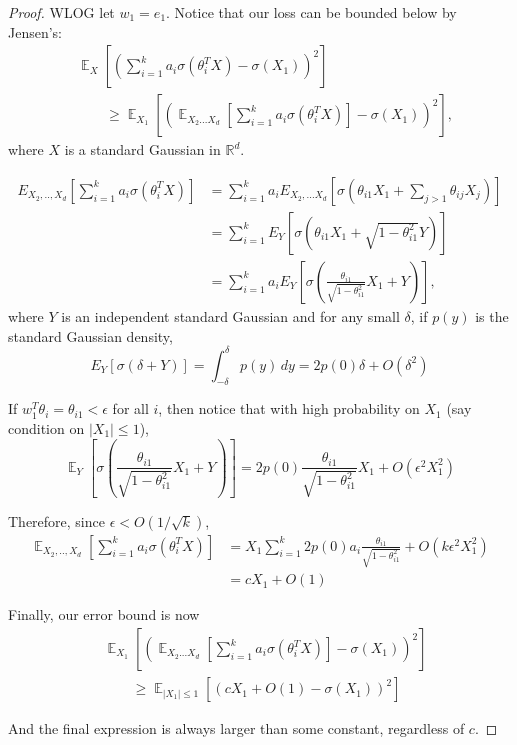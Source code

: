 \documentclass{article}
\newcommand{\R}{{\mathbb{R}}}
\DeclareMathOperator*{\expt}{\mathbb{E}}
\newcommand{\EE}[2]{{\expt_{#1}{#2}}}
\begin{document}
\begin{proof}
WLOG let $w_1 = e_1$. Notice that our loss can be bounded below by Jensen's:
%
\begin{align*}
& \expt_X \left[ \left( \sum_{i=1}^k a_i \sigma(\theta_i^TX) - \sigma(X_1)\right)^2 \right] \\
& \qquad 
\geq \expt_{X_1} \left[ \left( \EE{X_2...X_d}{\left[ \sum_{i=1}^k a_i \sigma(\theta_i^TX) \right]}- \sigma(X_1)\right)^2 \right],
\end{align*}
where $X$ is a standard Gaussian in $\R^d$. 

\begin{align*}
E_{X_2,..,X_d} \left[  \sum_{i=1}^k a_i \sigma(\theta_i^TX) \right] &= \sum_{i=1}^k a_i E_{X_2,...X_d}\left[  \sigma(\theta_{i1}X_1 + \sum_{j >1} \theta_{ij}X_{j})  \right]\\
&= \sum_{i=1}^k E_{Y} \left[   \sigma(\theta_{i1}X_1 + \sqrt{1-\theta_{i1}^2}Y)  \right]  \\
&= \sum_{i=1}^k a_i E_{Y} \left[   \sigma(\textstyle\frac{\theta_{i1}}{\sqrt{1-\theta_{i1}^2}}X_1 + Y)  \right] ,
\end{align*}
where $Y$ is an independent standard Gaussian and for any small $\delta$, if $p(y)$ is the standard Gaussian density, 
%
\[ E_Y[\sigma(\delta + Y)] = \int_{-\delta}^{\delta} p(y) \, dy = 2p(0)\delta + O(\delta^2) \]

If $w_1^T\theta_i = \theta_{i1} < \epsilon$ for all $i$, then notice that with high probability on $X_1$ (say condition on $|X_1| \leq 1$), 
%
\[\expt_{Y} \left[   \sigma(\textstyle\frac{\theta_{i1}}{\sqrt{1-\theta_{i1}^2}}X_1 + Y)  \right] = 2p(0)\textstyle\frac{\theta_{i1}}{\sqrt{1-\theta_{i1}^2}}X_1 + O(\epsilon^2X_1^2)\]

Therefore, since $\epsilon < O(1/\sqrt{k})$,
%
\begin{align*}
\expt_{X_2,..,X_d} \left[  \sum_{i=1}^k a_i \sigma(\theta_i^TX)
  \right]  & = X_1
  \sum_{i=1}^k2p(0)a_i\textstyle\frac{\theta_{i1}}{\sqrt{1-\theta_{i1}^2}}
  + O(k\epsilon^2X_1^2) \\
& = cX_1+O(1)
\end{align*}


Finally, our error bound is now
%
\begin{align*}
& \expt_{X_1} \left[ \left( \expt_{X_2...X_d}\left[ \sum_{i=1}^k a_i
      \sigma(\theta_i^TX) \right]- \sigma(X_1)\right)^2 \right] \\
& \qquad \geq
\expt_{|X_1| \leq 1}[(cX_1+O(1) - \sigma(X_1))^2]
\end{align*}

And the final expression is always larger than some constant, regardless of $c$.
\end{proof}
\end{document}
